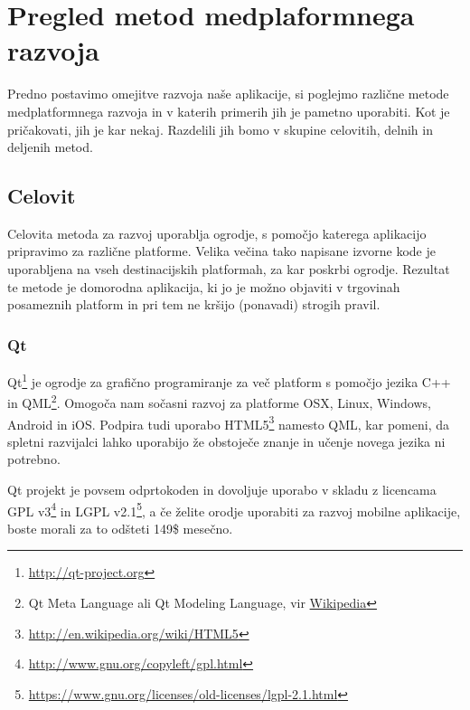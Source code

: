 \graphicspath{{img/}}









\chapter{Pregled metod medplaformnega razvoja}
\label{chap:overview}

Predno postavimo omejitve razvoja naše aplikacije, si poglejmo različne metode medplatformnega razvoja in v katerih primerih jih je pametno uporabiti. Kot je pričakovati, jih je kar nekaj. Razdelili jih bomo v skupine celovitih, delnih in deljenih metod.

\section{Celovit}

Celovita metoda za razvoj uporablja ogrodje, s pomočjo katerega aplikacijo pripravimo za različne platforme. Velika večina tako napisane izvorne kode je uporabljena na vseh destinacijskih platformah, za kar poskrbi ogrodje. Rezultat te metode je domorodna aplikacija, ki jo je možno objaviti v trgovinah posameznih platform in pri tem ne kršijo (ponavadi) strogih pravil.

\subsection{Qt}

Qt\footnote{\href{http://qt-project.org}{http://qt-project.org}} je ogrodje za grafično programiranje za več platform s pomočjo jezika C++ in QML\footnote{Qt Meta Language ali Qt Modeling Language, vir \href{http://en.wikipedia.org/wiki/QML}{Wikipedia}}. Omogoča nam sočasni razvoj za platforme OSX, Linux, Windows, Android in iOS. Podpira tudi uporabo HTML5\footnote{\href{http://en.wikipedia.org/wiki/HTML5}{http://en.wikipedia.org/wiki/HTML5}} namesto QML, kar pomeni, da spletni razvijalci lahko uporabijo že obstoječe znanje in učenje novega jezika ni potrebno.

Qt projekt je povsem odprtokoden in dovoljuje uporabo v skladu z licencama GPL v3\footnote{\href{http://www.gnu.org/copyleft/gpl.html}{http://www.gnu.org/copyleft/gpl.html}} in LGPL v2.1\footnote{\href{https://www.gnu.org/licenses/old-licenses/lgpl-2.1.html}{https://www.gnu.org/licenses/old-licenses/lgpl-2.1.html}}, a če želite orodje uporabiti za razvoj mobilne aplikacije, boste morali za to odšteti 149\$ mesečno.

